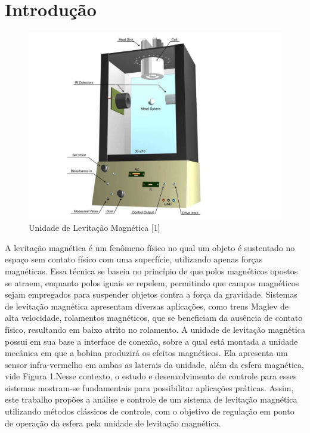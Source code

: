 \section{Introdução}

\begin{figure}
    \centering 
    \includegraphics[width=\linewidth]{Unidade_MagLev.png}
    \caption{Unidade de Levitação Magnética [1]}
    \label{fig:1}
\end{figure}

A levitação magnética é um fenômeno físico no qual um objeto é sustentado no espaço sem contato físico com uma superfície, utilizando apenas forças magnéticas. Essa técnica se baseia no princípio de que polos magnéticos opostos se atraem, enquanto polos iguais se repelem, permitindo que campos magnéticos sejam empregados para suspender objetos contra a força da gravidade. Sistemas de levitação magnética apresentam diversas aplicações, como trens Maglev de alta velocidade, rolamentos magnéticos, que se beneficiam da ausência de contato físico, resultando em baixo atrito no rolamento. A unidade de levitação magnética possui em sua base a interface de conexão, sobre a qual está montada a unidade mecânica em que a bobina produzirá os efeitos magnéticos. Ela apresenta um sensor infra-vermelho em ambas as laterais da unidade, além da esfera magnética, vide Figura 1.Nesse contexto, o estudo e desenvolvimento de controle para esses sistemas mostram-se fundamentais para possibilitar aplicações práticas. Assim, este trabalho propões a análise e controle de um sistema de levitação magnética utilizando métodos clássicos de controle, com o objetivo de regulação em ponto de operação da esfera pela unidade de levitação magnética.


